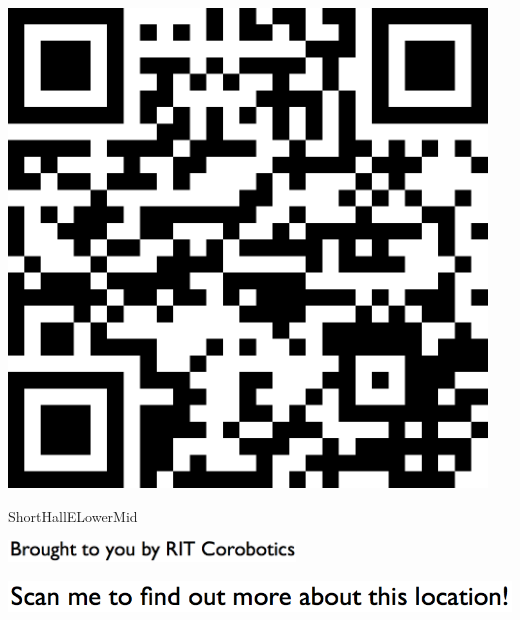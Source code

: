 \documentclass[letterpaper]{article}
\begin{document}
 \begingroup 
 \centerline{\includegraphics[scale=1,width=5in,height=5in]{ShortHallELowerMid.png}} 
 \endgroup 
 \vspace*{\fill} 

 \hfill{\small ShortHallELowerMid} 

  \vspace{0.7in} 
 
 \centerline{\includegraphics[scale=1,width=3in]{text-bottom.png}} 
 
 \pagebreak 
{} 
 \vspace*{\fill} 
 
  \centerline{\includegraphics[scale=1,width=6in]{text-top.png}} 
 
 \vspace{0.5in} 
 
\end{document}

